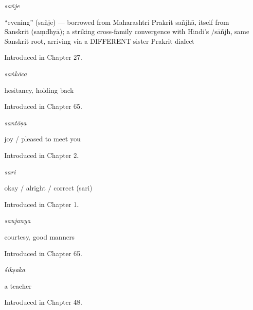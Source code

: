 \noindent\begin{minipage}[t]{\linewidth}
\raggedright
\textbf{}\enspace\emph{sañje}\par
\small \textquotedblleft{}evening\textquotedblright{} (sañje) — borrowed from Maharashtri Prakrit sañjhā, itself from Sanskrit  (saṃdhyā); a striking cross-family convergence with Hindi's /sāñjh, same Sanskrit root, arriving via a DIFFERENT sister Prakrit dialect\par
\footnotesize Introduced in Chapter 27.
\end{minipage}\par\medskip

\noindent\begin{minipage}[t]{\linewidth}
\raggedright
\textbf{}\enspace\emph{saṅkōca}\par
\small hesitancy, holding back\par
\footnotesize Introduced in Chapter 65.
\end{minipage}\par\medskip

\noindent\begin{minipage}[t]{\linewidth}
\raggedright
\textbf{}\enspace\emph{santōṣa}\par
\small joy / pleased to meet you\par
\footnotesize Introduced in Chapter 2.
\end{minipage}\par\medskip

\noindent\begin{minipage}[t]{\linewidth}
\raggedright
\textbf{}\enspace\emph{sari}\par
\small okay / alright / correct (sari)\par
\footnotesize Introduced in Chapter 1.
\end{minipage}\par\medskip

\noindent\begin{minipage}[t]{\linewidth}
\raggedright
\textbf{}\enspace\emph{saujanya}\par
\small courtesy, good manners\par
\footnotesize Introduced in Chapter 65.
\end{minipage}\par\medskip

\noindent\begin{minipage}[t]{\linewidth}
\raggedright
\textbf{}\enspace\emph{śikṣaka}\par
\small a teacher\par
\footnotesize Introduced in Chapter 48.
\end{minipage}\par\medskip

